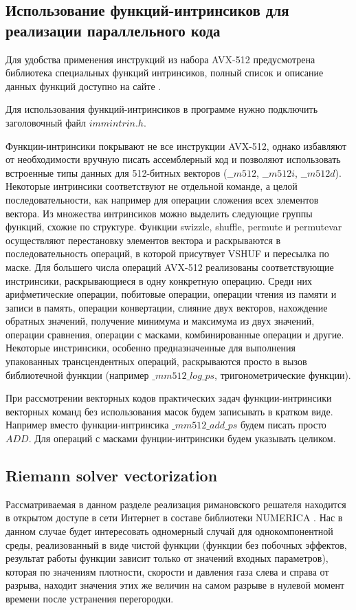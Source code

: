 \documentclass[
11pt,%
tightenlines,%
twoside,%
onecolumn,%
nofloats,%
nobibnotes,%
nofootinbib,%
superscriptaddress,%
noshowpacs,%
centertags]%
{revtex4}
\begin{document}
\subsection{Использование функций-интринсиков для реализации параллельного кода}

Для удобства применения инструкций из набора AVX-512 предусмотрена библиотека специальных функций интринсиков, полный список и описание данных функций доступно на сайте \cite{Intel_Intr}.

Для использования функций-интринсиков в программе нужно подключить заголовочный файл $immintrin.h$.

Функции-интринсики покрывают не все инструкции AVX-512, однако избавляют от необходимости вручную писать ассемблерный код и позволяют использовать встроенные типы данных для 512-битных векторов ($\_\_m512$, $\_\_m512i$, $\_\_m512d$).
Некоторые интринсики соответствуют не отдельной команде, а целой последовательности, как например для операции сложения всех элементов вектора.
Из множества интринсиков можно выделить следующие группы функций, схожие по структуре.
Функции swizzle, shuffle, permute и permutevar осуществляют перестановку элементов вектора и раскрываются в последовательность операций, в которой присутвует VSHUF и пересылка по маске.
Для большего числа операций AVX-512 реализованы соответствующие инстринсики, раскрывающиеся в одну конкретную операцию.
Среди них арифметические операции, побитовые операции, операции чтения из памяти и записи в память, операции конвертации, слияние двух векторов, нахождение обратных значений, получение минимума и максимума из двух значений, операции сравнения, операции с масками, комбинированные операции и другие.
Некоторые инстринсики, особенно предназначенные для выполнения упакованных трансцендентных операций, раскрываются просто в вызов библиотечной функции (например $\_mm512\_log\_ps$, тригонометрические функции).

При рассмотрении векторных кодов практических задач функции-интринсики векторных команд без использования масок будем записывать в кратком виде.
Например вместо функции-интринсика $\_mm512\_add\_ps$ будем писать просто $ADD$.
Для операций с масками фунции-интринсики будем указывать целиком.

\subsection{Riemann solver vectorization}

Рассматриваемая в данном разделе реализация римановского решателя находится в открытом доступе в сети Интернет в составе библиотеки NUMERICA \cite{Numerica}.
Нас в данном случае будет интересовать одномерный случай для однокомпонентной среды, реализованный в виде чистой функции (функции без побочных эффектов, результат работы функции зависит только от значений входных параметров), которая по значениям плотности, скорости и давления газа слева и справа от разрыва, находит значения этих же величин на самом разрыве в нулевой момент времени после устранения перегородки.
\end{document}

